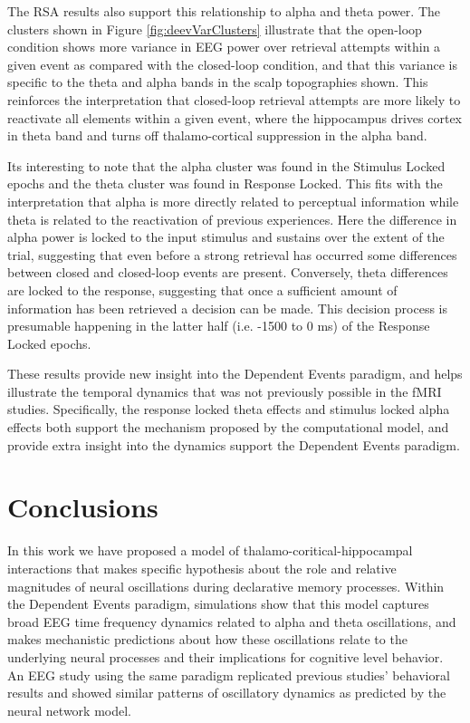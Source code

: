 \documentclass[11pt, titlepage, twoside]{article}
\begin{document}
The RSA results also support this relationship to alpha and theta power.  The clusters shown in Figure \ref{fig:deevVarClusters} illustrate that the open-loop condition shows more variance in EEG power over retrieval attempts within a given event as compared with the closed-loop condition, and that this variance is specific to the theta and alpha bands in the scalp topographies shown.  This reinforces the interpretation that closed-loop retrieval attempts are more likely to reactivate all elements within a given event, where the hippocampus drives cortex in theta band and turns off thalamo-cortical suppression in the alpha band.  

Its interesting to note that the alpha cluster was found in the Stimulus Locked epochs and the theta cluster was found in Response Locked.  This fits with the interpretation that alpha is more directly related to perceptual information while theta is related to the reactivation of previous experiences.  Here the difference in alpha power is locked to the input stimulus and sustains over the extent of the trial, suggesting that even before a strong retrieval has occurred some differences between closed and closed-loop events are present.  Conversely, theta differences are locked to the response, suggesting that once a sufficient amount of information has been retrieved a decision can be made.  This decision process is presumable happening in the latter half (i.e. -1500 to 0 ms) of the Response Locked epochs.

These results provide new insight into the Dependent Events paradigm, and helps illustrate the temporal dynamics that was not previously possible in the fMRI studies.  Specifically, the response locked theta effects and stimulus locked alpha effects both support the mechanism proposed by the computational model, and provide extra insight into the dynamics support the Dependent Events paradigm.    



\section{Conclusions}\label{sec:conclusions}

In this work we have proposed a model of thalamo-coritical-hippocampal interactions that makes specific hypothesis about the role and relative magnitudes of neural oscillations during declarative memory processes.  Within the Dependent Events paradigm, simulations show that this model captures broad EEG time frequency dynamics related to alpha and theta oscillations, and makes mechanistic predictions about how these oscillations relate to the underlying neural processes and their implications for cognitive level behavior.  An EEG study using the same paradigm replicated previous studies' behavioral results and showed similar patterns of oscillatory dynamics as predicted by the neural network model.  
\end{document}
